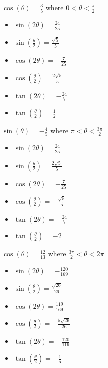 \documentclass{ximera}
\begin{document}
\begin{question}
\begin{problem}
$\cos(\theta) = \frac{3}{5}$ where $0 < \theta < \frac{\pi}{2}$

\begin{solution}
\begin{itemize}

\item $\sin(2\theta) = \frac{24}{25}$
\item $\sin\left(\frac{\theta}{2}\right) = \frac{\sqrt{5}}{5}$
\item $\cos(2\theta) = -\frac{7}{25}$
\item $\cos\left(\frac{\theta}{2}\right) = \frac{2\sqrt{5}}{5}$
\item $\tan(2\theta)=-\frac{24}{7} $
\item $\tan\left(\frac{\theta}{2}\right) = \frac{1}{2}$

\end{itemize}
\end{solution}
\end{problem}

\begin{problem}
$\sin(\theta) = -\frac{4}{5}$ where $\pi < \theta < \frac{3\pi}{2}$

\begin{solution}
\begin{itemize}

\item $\sin(2\theta) = \frac{24}{25}$
\item $\sin\left(\frac{\theta}{2}\right) = \frac{2\sqrt{5}}{5}$
\item $\cos(2\theta) = -\frac{7}{25}$
\item $\cos\left(\frac{\theta}{2}\right) = -\frac{\sqrt{5}}{5}$
\item $\tan(2\theta)=-\frac{24}{7} $
\item $\tan\left(\frac{\theta}{2}\right) = -2$

\end{itemize}
\end{solution}
\end{problem}

\begin{problem}
$\cos(\theta) = \frac{12}{13}$ where $\frac{3\pi}{2} < \theta < 2\pi$

\begin{solution}
\begin{itemize}

\item $\sin(2\theta) = -\frac{120}{169}$
\item $\sin\left(\frac{\theta}{2}\right) = \frac{\sqrt{26}}{26}$
\item $\cos(2\theta) = \frac{119}{169}$
\item $\cos\left(\frac{\theta}{2}\right) = -\frac{5\sqrt{26}}{26}$
\item $\tan(2\theta)=-\frac{120}{119}$
\item $\tan\left(\frac{\theta}{2}\right) = -\frac{1}{5}$


\end{itemize}
\end{solution}
\end{problem}
\end{question}
\end{document}
